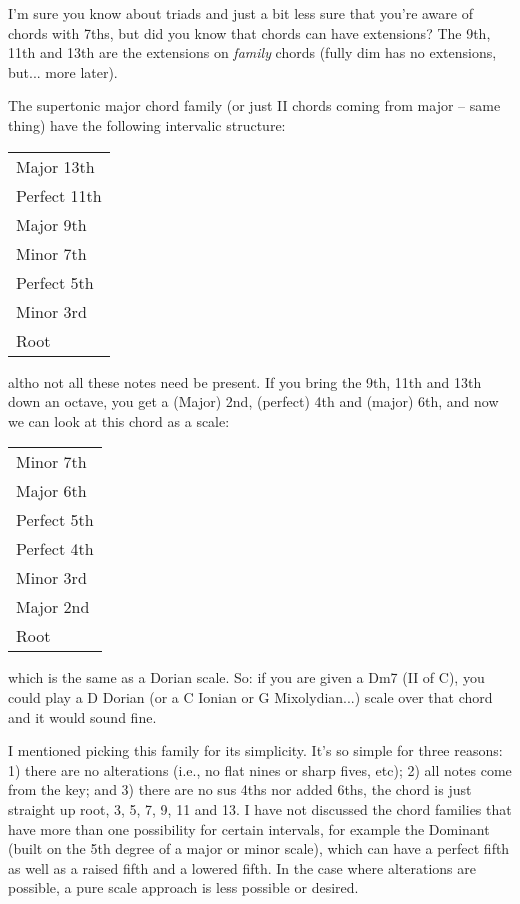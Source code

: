 I'm sure you know about triads and just a bit less sure that you're aware of
chords with 7ths, but did you know that chords can have extensions? The 9th,
11th and 13th are the extensions on \emph{family} chords (fully dim has no
extensions, but... more later).

The supertonic major chord family (or just II chords coming from major -- same
thing) have the following intervalic structure:

\begin{center}
\begin{tabular}{ | l | }
	\hline
  Major 13th\\
  Perfect 11th\\
  Major 9th\\
  Minor 7th\\
  Perfect 5th\\
  Minor 3rd\\
  Root\\
  \hline
\end{tabular}
\end{center}%

altho not all these notes need be present. If you bring the 9th, 11th and 13th
down an octave, you get a (Major) 2nd, (perfect) 4th and (major) 6th, and now
we can look at this chord as a scale:

\begin{center}
\begin{tabular}{ | l | }
	\hline
  Minor 7th\\
  Major 6th\\
  Perfect 5th\\
  Perfect 4th\\
  Minor 3rd\\
  Major 2nd\\
  Root\\
  \hline
\end{tabular}
\end{center}%


which is the same as a Dorian scale. So: if you are given a Dm7 (II of C),
you could play a D Dorian (or a C Ionian or G Mixolydian...) scale over that
chord and it would sound fine.

I mentioned picking this family for its simplicity. It's so simple for three
reasons: 1) there are no alterations (i.e., no flat nines or sharp fives, etc);
2) all notes come from the key; and 3) there are no sus 4ths nor added 6ths,
the chord is just straight up root, 3, 5, 7, 9, 11 and 13. I have not discussed
the chord families that have more than one possibility for certain intervals,
for example the Dominant (built on the 5th degree of a major or minor scale),
which can have a perfect fifth as well as a raised fifth and a lowered fifth.
In the case where alterations are possible, a pure scale approach is less
possible or desired.

